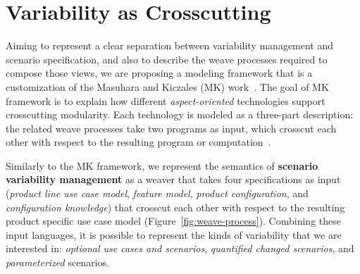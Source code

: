 \documentclass{acm_proc_article-sp}
\begin{document}


\section{Variability as Crosscutting}
\label{sec:models}

Aiming to represent a clear separation between variability management and scenario specification, and also 
to describe the weave processes required to compose those views, we are proposing a modeling framework that is a 
customization of the Masuhara and Kiczales (MK) work~\cite{kiczales-ecoop-2003}. The goal of MK framework is to
explain how different \emph{aspect-oriented} technologies support crosscutting modularity. Each technology is modeled 
as a three-part description: the related weave processes take two programs as input, which crosscut each other with respect 
to the resulting program or computation~\cite{kiczales-ecoop-2003}. 

Similarly to the MK framework, we represent the semantics of \textbf{scenario variability management} as a weaver that takes four specifications
as input (\emph{product line use case model}, \emph{feature model}, \emph{product configuration}, and \emph{configuration knowledge}) that 
crosscut each other with respect to the resulting product specific use case model (Figure~\ref{fig:weave-process}). Combining these input languages, 
it is possible to represent the kinds of variability that we are interested in: \emph{optional use cases and scenarios}, \emph{quantified changed scenarios}, 
and \emph{parameterized} scenarios. 
\end{document}

